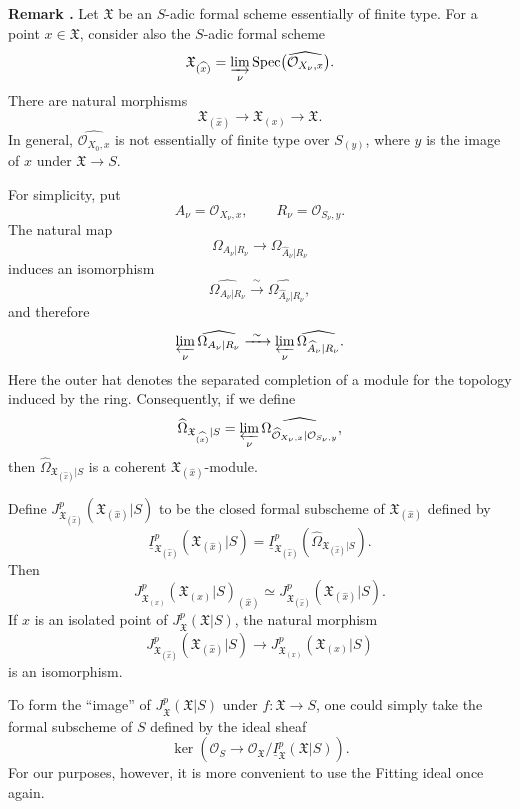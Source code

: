 \medskip
\noindent\textbf{Remark .}
Let $\mathfrak X$ be an $S$-adic formal scheme essentially of finite
type. For a point $x\in\mathfrak X$, consider also the $S$-adic
formal scheme
\[
\mathfrak X_{(\widehat{x})}
=\varinjlim_\nu
 \operatorname{Spec}\bigl(\widehat{\mathcal O_{X_\nu,x}}\bigr).
\]
There are natural morphisms
\[
\mathfrak X_{(\widehat{x})}
\longrightarrow\mathfrak X_{(x)}
\longrightarrow\mathfrak X.
\]
In general, $\widehat{\mathcal O_{X_0,x}}$ is not essentially of
finite type over $S_{(y)}$, where $y$ is the image of $x$ under
$\mathfrak X\longrightarrow S$.

For simplicity, put
\[
A_\nu=\mathcal O_{X_\nu,x},
\qquad R_\nu=\mathcal O_{S_\nu,y}.
\]
The natural map
\[
\Omega_{A_\nu|R_\nu}
\longrightarrow\Omega_{\widehat A_\nu|R_\nu}
\]
induces an isomorphism
\[
\widehat{\Omega_{A_\nu|R_\nu}}
\xrightarrow{\ \sim\ }
\widehat{\Omega_{\widehat A_\nu|R_\nu}},
\]
and therefore
\[
\varprojlim_\nu\widehat{\Omega_{A_\nu|R_\nu}}
\xrightarrow{\ \sim\ }
\varprojlim_\nu
 \widehat{\Omega_{\widehat A_\nu|R_\nu}}.
\]
Here the outer hat denotes the separated completion of a module for
the topology induced by the ring. Consequently, if we define
\[
\widehat\Omega_{\mathfrak X_{(\widehat{x})}|S}
=\varprojlim_\nu
 \widehat{\Omega_{
   \widehat{\mathcal O}_{X_\nu,x}|\mathcal O_{S_\nu,y}}},
\]
then $\widehat\Omega_{\mathfrak X_{(\widehat{x})}|S}$ is a coherent
$\mathfrak X_{(\widehat{x})}$-module.


Define
$J_{\mathfrak X_{(\widehat{x})}}^p
 (\mathfrak X_{(\widehat{x})}|S)$
to be the closed formal subscheme of
$\mathfrak X_{(\widehat{x})}$ defined by
\[
\underline I_{\mathfrak X_{(\widehat{x})}}^p
 (\mathfrak X_{(\widehat{x})}|S)
=\underline I_{\mathfrak X_{(\widehat{x})}}^p
 (\widehat\Omega_{\mathfrak X_{(\widehat{x})}|S}).
\]
Then
\[
J_{\mathfrak X_{(x)}}^p(\mathfrak X_{(x)}|S)_{(\widehat{x})}
\simeq
J_{\mathfrak X_{(\widehat{x})}}^p
 (\mathfrak X_{(\widehat{x})}|S).
\]
If $x$ is an isolated point of
$J_{\mathfrak X}^p(\mathfrak X|S)$, the natural morphism
\[
J_{\mathfrak X_{(\widehat{x})}}^p
 (\mathfrak X_{(\widehat{x})}|S)
\longrightarrow
J_{\mathfrak X_{(x)}}^p(\mathfrak X_{(x)}|S)
\]
is an isomorphism.

To form the ``image'' of $J_{\mathfrak X}^p(\mathfrak X|S)$ under
$f:\mathfrak X\longrightarrow S$, one could simply take the formal
subscheme of $S$ defined by the ideal sheaf
\[
\ker\left(
 \mathcal O_S\longrightarrow
 \mathcal O_{\mathfrak X}/
 \underline I_{\mathfrak X}^p(\mathfrak X|S)
\right).
\]
For our purposes, however, it is more convenient to use the Fitting
ideal once again.
